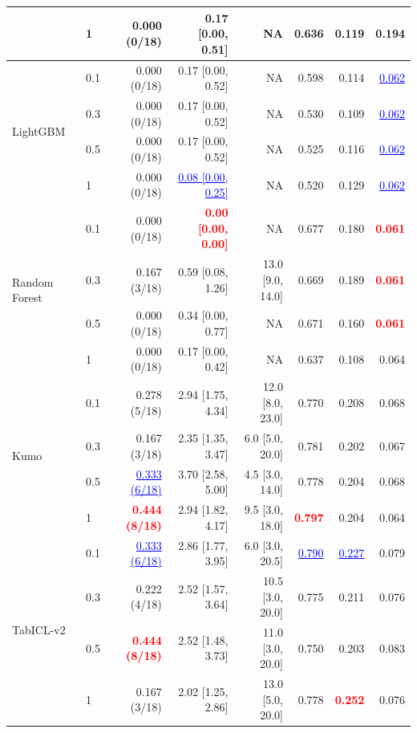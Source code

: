 \begin{table}[pos=!htbp,align=\centering]
{\begin{tabular}{llrrrrrr}
 & 1 & 0.000 (0/18) & 0.17 [0.00, 0.51] & NA & 0.636 & 0.119 & 0.194 \\
\midrule
\multirow{4}{*}{LightGBM} & 0.1 & 0.000 (0/18) & 0.17 [0.00, 0.52] & NA & 0.598 & 0.114 & \textcolor{blue}{\underline{0.062}} \\
 & 0.3 & 0.000 (0/18) & 0.17 [0.00, 0.52] & NA & 0.530 & 0.109 & \textcolor{blue}{\underline{0.062}} \\
 & 0.5 & 0.000 (0/18) & 0.17 [0.00, 0.52] & NA & 0.525 & 0.116 & \textcolor{blue}{\underline{0.062}} \\
 & 1 & 0.000 (0/18) & \textcolor{blue}{\underline{0.08 [0.00, 0.25]}} & NA & 0.520 & 0.129 & \textcolor{blue}{\underline{0.062}} \\
\midrule
\multirow{4}{*}{Random Forest} & 0.1 & 0.000 (0/18) & \textcolor{red}{\textbf{0.00 [0.00, 0.00]}} & NA & 0.677 & 0.180 & \textcolor{red}{\textbf{0.061}} \\
 & 0.3 & 0.167 (3/18) & 0.59 [0.08, 1.26] & 13.0 [9.0, 14.0] & 0.669 & 0.189 & \textcolor{red}{\textbf{0.061}} \\
 & 0.5 & 0.000 (0/18) & 0.34 [0.00, 0.77] & NA & 0.671 & 0.160 & \textcolor{red}{\textbf{0.061}} \\
 & 1 & 0.000 (0/18) & 0.17 [0.00, 0.42] & NA & 0.637 & 0.108 & 0.064 \\
\midrule
\multirow{4}{*}{Kumo} & 0.1 & 0.278 (5/18) & 2.94 [1.75, 4.34] & 12.0 [8.0, 23.0] & 0.770 & 0.208 & 0.068 \\
 & 0.3 & 0.167 (3/18) & 2.35 [1.35, 3.47] & 6.0 [5.0, 20.0] & 0.781 & 0.202 & 0.067 \\
 & 0.5 & \textcolor{blue}{\underline{0.333 (6/18)}} & 3.70 [2.58, 5.00] & 4.5 [3.0, 14.0] & 0.778 & 0.204 & 0.068 \\
 & 1 & \textcolor{red}{\textbf{0.444 (8/18)}} & 2.94 [1.82, 4.17] & 9.5 [3.0, 18.0] & \textcolor{red}{\textbf{0.797}} & 0.204 & 0.064 \\
\midrule
\multirow{4}{*}{TabICL-v2} & 0.1 & \textcolor{blue}{\underline{0.333 (6/18)}} & 2.86 [1.77, 3.95] & 6.0 [3.0, 20.5] & \textcolor{blue}{\underline{0.790}} & \textcolor{blue}{\underline{0.227}} & 0.079 \\
 & 0.3 & 0.222 (4/18) & 2.52 [1.57, 3.64] & 10.5 [3.0, 20.0] & 0.775 & 0.211 & 0.076 \\
 & 0.5 & \textcolor{red}{\textbf{0.444 (8/18)}} & 2.52 [1.48, 3.73] & 11.0 [3.0, 20.0] & 0.750 & 0.203 & 0.083 \\
 & 1 & 0.167 (3/18) & 2.02 [1.25, 2.86] & 13.0 [5.0, 20.0] & 0.778 & \textcolor{red}{\textbf{0.252}} & 0.076 \\
\bottomrule
\end{tabular}
}
\end{table}
